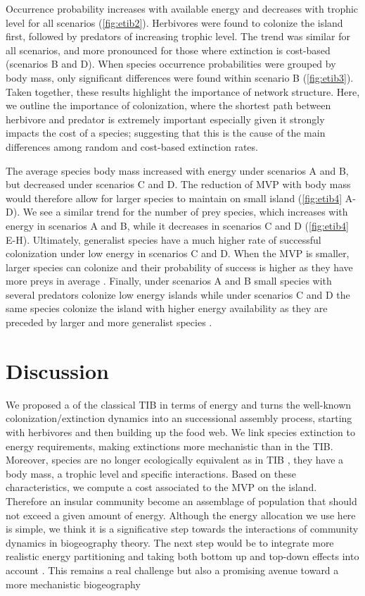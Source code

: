 Occurrence probability increases with available energy and decreases
with trophic level for all scenarios (\ref{fig:etib2}). Herbivores were
found to colonize the island first, followed by predators of increasing
trophic level. The trend was similar for all scenarios, and more
pronounced for those where extinction is cost-based (scenarios B and D).
When species occurrence probabilities were grouped by body mass, only
significant differences were found within scenario B (\ref{fig:etib3}).
Taken together, these results highlight the importance of network
structure. Here, we outline the importance of colonization, where the
shortest path between herbivore and predator is extremely important
especially given it strongly impacts the cost of a species; suggesting
that this is the cause of the main differences among random and
cost-based extinction rates.

The average species body mass increased with energy under scenarios A
and B, but decreased under scenarios C and D. The reduction of MVP with
body mass would therefore allow for larger species to maintain on small
island (\ref{fig:etib4} A-D). We see a similar trend for the number of
prey species, which increases with energy in scenarios A and B, while it
decreases in scenarios C and D (\ref{fig:etib4} E-H). Ultimately,
generalist species have a much higher rate of successful colonization
under low energy in scenarios C and D. When the MVP is smaller, larger
species can colonize and their probability of success is higher as they
have more preys in average \citep[due to the use of the niche model and
body mass as the niche axis][]{Williams2000, Gravel2013}. Finally, under
scenarios A and B small species with several predators colonize low
energy islands while under scenarios C and D the same species colonize
the island with higher energy availability as they are preceded by
larger and more generalist species \citep[ I-L]{fig:etib4}.

\section{Discussion}\label{discussion}

We proposed a of the classical TIB in terms of energy and turns the
well-known colonization/extinction dynamics into an successional
assembly process, starting with herbivores and then building up the food
web. We link species extinction to energy requirements, making
extinctions more mechanistic than in the TIB. Moreover, species are no
longer ecologically equivalent as in TIB \citep{Lomolino2009}, they have
a body mass, a trophic level and specific interactions. Based on these
characteristics, we compute a cost associated to the MVP on the island.
Therefore an insular community become an assemblage of population that
should not exceed a given amount of energy. Although the energy
allocation we use here is simple, we think it is a significative step
towards the interactions of community dynamics in biogeography theory.
The next step would be to integrate more realistic energy partitioning
\citep{DeRuiter1995} and taking both bottom up and top-down effects into
account \citep{Terborgh2001, Brown2013}. This remains a real challenge
but also a promising avenue toward a more mechanistic biogeography

